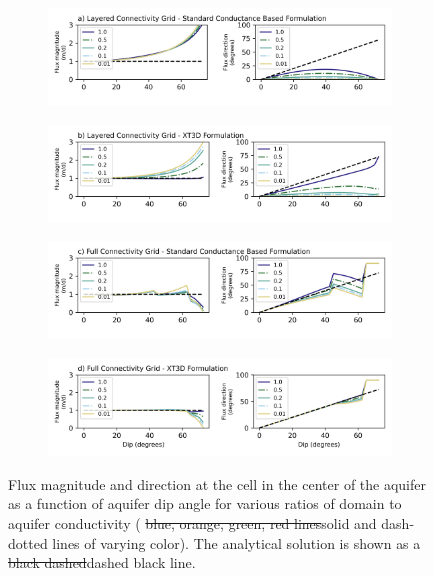 \documentclass{article}
\begin{document}
\begin{figure}[p!]
\centering
\begin{subfigure}{0.9\textwidth}
	\includegraphics[width=\textwidth]{../figures/fig4_0_paper.png}
\end{subfigure}
\begin{subfigure}{0.9\textwidth}
	\includegraphics[width=\textwidth]{../figures/fig4_1_paper.png}
\end{subfigure}
\begin{subfigure}{0.9\textwidth}
	\includegraphics[width=\textwidth]{../figures/fig4_2_paper.png}
\end{subfigure}
\begin{subfigure}{0.9\textwidth}
	\includegraphics[width=\textwidth]{../figures/fig4_3_paper.png}
\end{subfigure}

\caption{Flux magnitude and direction at the cell in the center of the aquifer as a function of aquifer dip angle for various ratios of domain to aquifer conductivity ({\color{red} \sout{blue, orange, green, red lines}solid and dash-dotted lines of varying color}). The analytical solution is shown as a {\color{red} \sout{black dashed}dashed black} line.}
\label{fig:fig4}
\end{figure}
\end{document}
